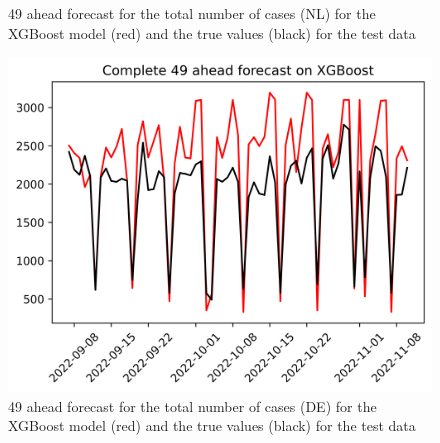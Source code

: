 \begin{figure}
\begin{minipage}{.32\textwidth}
  \caption{49 ahead forecast for the total number of cases (NL) for the XGBoost model (red) and the true values (black) for the test data}
  \label{fig:tot_cases_fc_49_xgb}
\end{minipage}
\begin{minipage}{.32\textwidth}
  \centering
  \includegraphics[width=\linewidth]{pics/49_ah/DE_Complete_49_ahead_XGBoost.png}
  \caption{49 ahead forecast for the total number of cases (DE) for the XGBoost model (red) and the true values (black) for the test data}
  \label{fig:tot_cases_fc_49_xgb_DE}
\end{minipage}

\end{figure}
